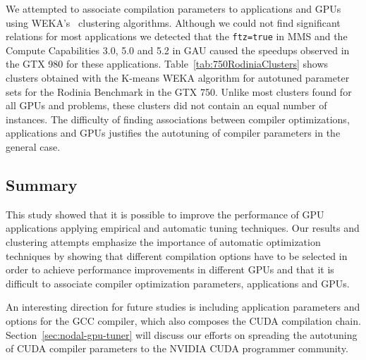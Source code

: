 We attempted to associate compilation parameters to applications and GPUs using
WEKA's~\cite{holmes1994weka} clustering algorithms. Although we could not find
significant relations for most applications we detected that the
\texttt{ftz=true} in MMS and the Compute Capabilities 3.0, 5.0 and 5.2 in GAU
caused the speedups observed in the GTX 980 for these applications.
Table~\ref{tab:750RodiniaClusters} shows clusters obtained with the K-means
WEKA algorithm for autotuned parameter sets for the Rodinia Benchmark in the
GTX 750. Unlike most clusters found for all GPUs and problems, these clusters
did not contain an equal number of instances. The difficulty of finding
associations between compiler optimizations, applications and GPUs justifies
the autotuning of compiler parameters in the general case.

\subsection{Summary}
\label{subsec:GPUconcl}

This study showed that it is possible to improve the performance of GPU
applications applying empirical and automatic tuning techniques. Our results
and clustering attempts emphasize the importance of automatic optimization
techniques by showing that different compilation options have to be selected in
order to achieve performance improvements in different GPUs and that it is
difficult to associate compiler optimization parameters, applications and GPUs.

An interesting direction for future studies is including application parameters
and options for the GCC compiler, which also composes the CUDA compilation
chain. Section~\ref{sec:nodal-gpu-tuner} will discuss our efforts on spreading the autotuning
of CUDA compiler parameters to the NVIDIA CUDA programmer community.
